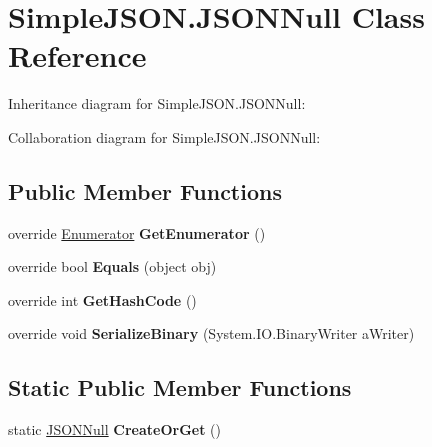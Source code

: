 \hypertarget{classSimpleJSON_1_1JSONNull}{}\section{Simple\+J\+S\+O\+N.\+J\+S\+O\+N\+Null Class Reference}
\label{classSimpleJSON_1_1JSONNull}


Inheritance diagram for Simple\+J\+S\+O\+N.\+J\+S\+O\+N\+Null\+:


Collaboration diagram for Simple\+J\+S\+O\+N.\+J\+S\+O\+N\+Null\+:
\subsection*{Public Member Functions}
\begin{DoxyCompactItemize}
\item 
override \hyperlink{structSimpleJSON_1_1JSONNode_1_1Enumerator}{Enumerator} {\bfseries Get\+Enumerator} ()\hypertarget{classSimpleJSON_1_1JSONNull_a22d73154221711bd3553d9abd2ae035b}{}\label{classSimpleJSON_1_1JSONNull_a22d73154221711bd3553d9abd2ae035b}

\item 
override bool {\bfseries Equals} (object obj)\hypertarget{classSimpleJSON_1_1JSONNull_a5b64f99cb67243c80ffcc0b7ca691c3c}{}\label{classSimpleJSON_1_1JSONNull_a5b64f99cb67243c80ffcc0b7ca691c3c}

\item 
override int {\bfseries Get\+Hash\+Code} ()\hypertarget{classSimpleJSON_1_1JSONNull_ad4dffc65b04a2c206860a68b5151cb8c}{}\label{classSimpleJSON_1_1JSONNull_ad4dffc65b04a2c206860a68b5151cb8c}

\item 
override void {\bfseries Serialize\+Binary} (System.\+I\+O.\+Binary\+Writer a\+Writer)\hypertarget{classSimpleJSON_1_1JSONNull_aa73333564753893427fa8b532a8d10e8}{}\label{classSimpleJSON_1_1JSONNull_aa73333564753893427fa8b532a8d10e8}

\end{DoxyCompactItemize}
\subsection*{Static Public Member Functions}
\begin{DoxyCompactItemize}
\item 
static \hyperlink{classSimpleJSON_1_1JSONNull}{J\+S\+O\+N\+Null} {\bfseries Create\+Or\+Get} ()\hypertarget{classSimpleJSON_1_1JSONNull_a84bc8bdbc7fb235750e1c682ec7d5a21}{}\label{classSimpleJSON_1_1JSONNull_a84bc8bdbc7fb235750e1c682ec7d5a21}

\end{DoxyCompactItemize}
